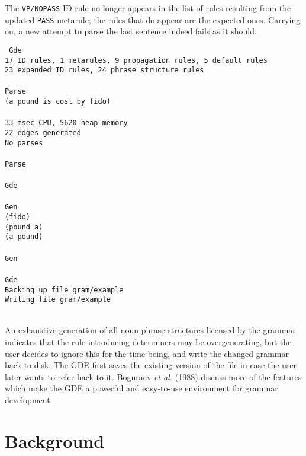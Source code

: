 The {\tt VP/NOPASS} ID rule no longer appears in the list of rules
resulting from the updated {\tt PASS} metarule; the rules that do appear
are the expected ones. Carrying on, a new attempt to parse the last sentence
indeed fails as it should.
\begin{display}
{\small\tt
Gde\\
17 ID rules, 1 metarules, 9 propagation rules, 5 default rules\\
23 expanded ID rules, 24 phrase structure rules\\
\\
Parse\ran{}\\
(a pound is cost by fido)\\
\\
33 msec CPU, 5620 heap memory\\
22 edges generated\\
No parses\\
\\
Parse\ran{}\\
\\
Gde\\
\\
Gen\ran{}\\
(fido)\\
(pound a)\\
(a pound)\\
\\
Gen\ran{}\\
\\
Gde\\
Backing up file gram/example\\
Writing file gram/example\\
\\
} \end{display}
An exhaustive generation of all noun phrase structures licensed by the
grammar indicates that the rule introducing determiners may be
overgenerating, but the user decides to ignore this for the time being, and
write the changed grammar back to disk.  The GDE first saves the existing
version of the file in case the user later wants to refer back to it.
Boguraev {\it et al.} (1988) discuss more of the features which make
the GDE a powerful and easy-to-use environment for grammar development.

\section{Background}

